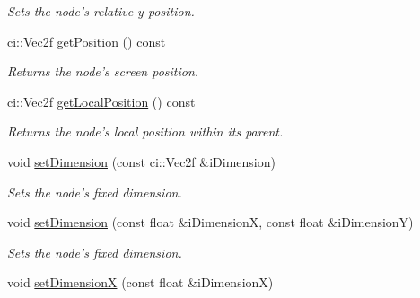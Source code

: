\begin{DoxyCompactItemize}
\begin{DoxyCompactList}\small\item\em Sets the node's relative y-\/position. \end{DoxyCompactList}\item 
\hypertarget{class_gui_base_a4635594f079588835e5883fc6fecaee6}{ci\-::\-Vec2f \hyperlink{class_gui_base_a4635594f079588835e5883fc6fecaee6}{get\-Position} () const }\label{class_gui_base_a4635594f079588835e5883fc6fecaee6}

\begin{DoxyCompactList}\small\item\em Returns the node's screen position. \end{DoxyCompactList}\item 
\hypertarget{class_gui_base_a6246f3646b4ea1b4a441b3ab03236ed0}{ci\-::\-Vec2f \hyperlink{class_gui_base_a6246f3646b4ea1b4a441b3ab03236ed0}{get\-Local\-Position} () const }\label{class_gui_base_a6246f3646b4ea1b4a441b3ab03236ed0}

\begin{DoxyCompactList}\small\item\em Returns the node's local position within its parent. \end{DoxyCompactList}\item 
\hypertarget{class_gui_base_a98fed57a0ec8a7e802c30c69f5f05e92}{void \hyperlink{class_gui_base_a98fed57a0ec8a7e802c30c69f5f05e92}{set\-Dimension} (const ci\-::\-Vec2f \&i\-Dimension)}\label{class_gui_base_a98fed57a0ec8a7e802c30c69f5f05e92}

\begin{DoxyCompactList}\small\item\em Sets the node's fixed dimension. \end{DoxyCompactList}\item 
\hypertarget{class_gui_base_a52e34244954a8d3fd17d5a40809d6491}{void \hyperlink{class_gui_base_a52e34244954a8d3fd17d5a40809d6491}{set\-Dimension} (const float \&i\-Dimension\-X, const float \&i\-Dimension\-Y)}\label{class_gui_base_a52e34244954a8d3fd17d5a40809d6491}

\begin{DoxyCompactList}\small\item\em Sets the node's fixed dimension. \end{DoxyCompactList}\item 
\hypertarget{class_gui_base_a63efdb39227f4803b29a9ed8d2d7595c}{void \hyperlink{class_gui_base_a63efdb39227f4803b29a9ed8d2d7595c}{set\-Dimension\-X} (const float \&i\-Dimension\-X)}\label{class_gui_base_a63efdb39227f4803b29a9ed8d2d7595c}


\end{DoxyCompactItemize}
